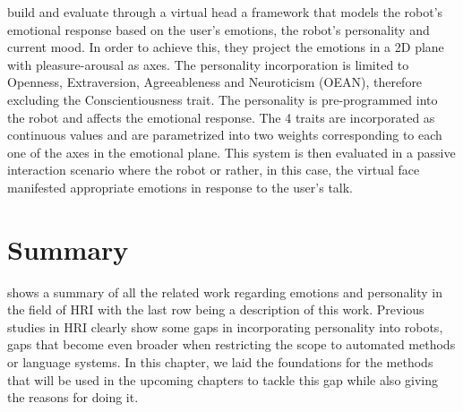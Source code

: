 \documentclass[nomenclature, english, biblatex]{kththesis}
\begin{document}
\textcite{han2012robotic} build and evaluate through a virtual head a framework that models the robot's emotional response based on the user's emotions, the robot's personality and current mood. In order to achieve this, they project the emotions in a 2D plane with pleasure-arousal as axes. The personality incorporation is limited to Openness, Extraversion, Agreeableness and Neuroticism (OEAN), therefore excluding the Conscientiousness trait. The personality is pre-programmed into the robot and affects the emotional response. The 4 traits are incorporated as continuous values and are parametrized into two weights corresponding to each one of the axes in the emotional plane. This system is then evaluated in a passive interaction scenario where the robot or rather, in this case, the virtual face manifested appropriate emotions in response to the user's talk.
\section{Summary}
 shows a summary of all the related work regarding emotions and personality in the field of HRI with the last row being a description of this work.
Previous studies in \gls{HRI} clearly show some gaps in incorporating personality into robots, gaps that become even broader when restricting the scope to automated methods or language systems. In this chapter, we laid the foundations for the methods that will be used in the upcoming chapters to tackle this gap while also giving the reasons for doing it.
\end{document}
